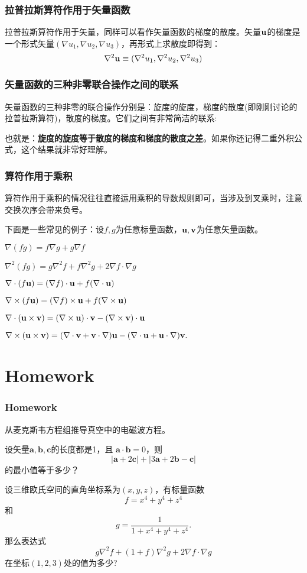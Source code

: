 \documentclass[CJK]{beamer}
\begin{document}
\begin{frame}
  \frametitle{拉普拉斯算符作用于矢量函数}
  拉普拉斯算符作用于矢量，同样可以看作矢量函数的梯度的散度。矢量${\mathbf{u}}$的梯度是一个形式矢量$(\nabla u_1, \nabla u_2, \nabla u_3)$，再形式上求散度即得到：
  $$\nabla^2{\mathbf{u}} \equiv (\nabla^2 u_1, \nabla^2 u_2, \nabla^2 u_3)$$
\end{frame}

\begin{frame}
  \frametitle{矢量函数的三种非零联合操作之间的联系}
  矢量函数的三种非零的联合操作分别是：旋度的旋度，梯度的散度(即刚刚讨论的拉普拉斯算符)，散度的梯度。它们之间有非常简洁的联系:

  \tbox{$$\nabla\times (\nabla \times \vecu) =  \nabla(\nabla\cdot \vecu) - \nabla^2\vecu$$}
  也就是：{\bf 旋度的旋度等于散度的梯度和梯度的散度之差}。如果你还记得二重外积公式，这个结果就非常好理解。
\end{frame}


\begin{frame}
  \frametitle{算符作用于乘积}
  算符作用于乘积的情况往往直接运用乘积的导数规则即可，当涉及到叉乘时，注意交换次序会带来负号。

  下面是一些常见的例子：设$f,g$为任意标量函数，${\mathbf{u}},{\mathbf{v}}$为任意矢量函数。

  \bitem
 \item{$\nabla (fg) = f\nabla g + g\nabla f$}
 \item{$ \nabla^2(fg) = g\nabla^2f + f\nabla^2g + 2\nabla f\cdot\nabla g$}
 \item{$\nabla\cdot(f{\mathbf{u}}) = (\nabla f) \cdot {\mathbf{u}} + f(\nabla \cdot {\mathbf{u}}) $}
 \item{$ \nabla\times (f{\mathbf{u}}) = (\nabla f)\times{\mathbf{u}} + f(\nabla \times {\mathbf{u}}) $}
 \item{$ \nabla\cdot({\mathbf{u}}\times{\mathbf{v}}) = (\nabla\times{\mathbf{u}})\cdot {\mathbf{v}} - (\nabla\times{\mathbf{v}})\cdot {\mathbf{u}} $}
 \item{$ \nabla\times({\mathbf{u}}\times{\mathbf{v}}) = (\nabla\cdot{\mathbf{v}} + {\mathbf{v}}\cdot \nabla){\mathbf{u}} - (\nabla\cdot{\mathbf{u}}+{\mathbf{u}}\cdot \nabla){\mathbf{v}}. $}   
   \eitem

\end{frame}


\section{Homework}

\begin{frame}
  \frametitle{Homework}
  
  \bitem
\item{从麦克斯韦方程组推导真空中的电磁波方程。}
  \item{设矢量$\mathbf{a}, \mathbf{b}, \mathbf{c}$的长度都是1，且 $\mathbf{a}\cdot\mathbf{b} = 0$，则 
$$|\mathbf{a}+2\mathbf{c}| + |3\mathbf{a}+2\mathbf{b}-\mathbf{c}|$$
    的最小值等于多少？}
  \item{设三维欧氏空间的直角坐标系为$(x,y,z)$，有标量函数
$$ f = x^4+y^4+z^4$$
和
$$ g = \frac{1}{1+x^4+y^4+z^4}. $$
那么表达式
$$ g\nabla^2 f + (1+f)\nabla^2 g + 2\nabla f\cdot\nabla g$$
在坐标$(1,2,3)$处的值为多少?}
  \eitem

  
\end{frame}
\end{document}
